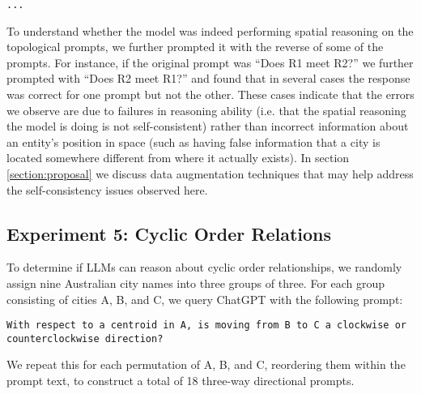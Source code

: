 \begin{lstlisting}[title=text here]
    ...
\end{lstlisting}

To understand whether the model was indeed performing spatial reasoning on the topological prompts, we further prompted it with the reverse of some of the prompts.
For instance, if the original prompt was ``Does R1 meet R2?'' we further prompted with ``Does R2 meet R1?'' and found that in several cases the response was correct for one prompt but not the other.
These cases indicate that the errors we observe are due to failures in reasoning ability (i.e. that the spatial reasoning the model is doing is not self-consistent) rather than incorrect information about an entity's position in space (such as having false information that a city is located somewhere different from where it actually exists).
In section \ref{section:proposal} we discuss data augmentation techniques that may help address the self-consistency issues observed here.



\subsection{Experiment 5: Cyclic Order Relations}

To determine if LLMs can reason about cyclic order relationships, we randomly assign nine Australian city names into three groups of three.
For each group consisting of cities A, B, and C, we query ChatGPT with the following prompt: 

\begin{lstlisting}[title=text here]
    With respect to a centroid in A, is moving from B to C a clockwise or counterclockwise direction?
\end{lstlisting}

We repeat this for each permutation of A, B, and C, reordering them within the prompt text, to construct a total of 18 three-way directional prompts.















